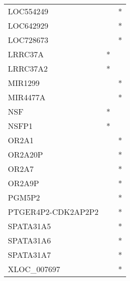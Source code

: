 \begin{longtable}{lcc}
LOC554249          &                &          * \\
LOC642929          &                &          * \\
LOC728673          &                &          * \\
LRRC37A            &              * &            \\
LRRC37A2           &              * &            \\
MIR1299            &                &          * \\
MIR4477A           &                &          * \\
NSF                &              * &            \\
NSFP1              &              * &            \\
OR2A1              &                &          * \\
OR2A20P            &                &          * \\
OR2A7              &                &          * \\
OR2A9P             &                &          * \\
PGM5P2             &                &          * \\
PTGER4P2-CDK2AP2P2 &                &          * \\
SPATA31A5          &                &          * \\
SPATA31A6          &                &          * \\
SPATA31A7          &                &          * \\
XLOC\_007697        &                &          * \\
\end{longtable}
